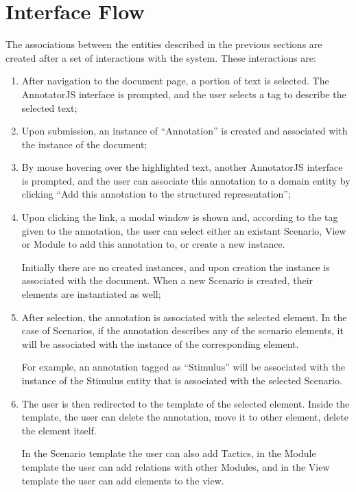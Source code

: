 \section{Interface Flow}
\label{section:interfaceFlow}

The associations between the entities described in the previous sections are created after a set of interactions with the system. These interactions are:

\begin{enumerate}
\item After navigation to the document page, a portion of text is selected. The AnnotatorJS interface is prompted, and the user selects a tag to describe the selected text;

\item Upon submission, an instance of ``Annotation'' is created and associated with the instance of the document;

\item By mouse hovering over the highlighted text, another AnnotatorJS interface is prompted, and the user can associate this annotation to a domain entity by clicking ``Add this annotation to the structured representation'';

\item Upon clicking the link, a modal window is shown and, according to the tag given to the annotation, the user can select either an existant Scenario, View or Module to add this annotation to, or create a new instance. 

Initially there are no created instances, and upon creation the instance is associated with the document. When a new Scenario is created, their elements are instantiated as well;

\item After selection, the annotation is associated with the selected element. In the case of Scenarios, if the annotation describes any of the scenario elements, it will be associated with the instance of the corresponding element. 

For example, an annotation tagged as ``Stimulus'' will be associated with the instance of the Stimulus entity that is associated with the selected Scenario.

\item The user is then redirected to the template of the selected element. Inside the template, the user can delete the annotation, move it to other element, delete the element itself. 

In the Scenario template the user can also add Tactics, in the Module template the user can add relations with other Modules, and in the View template the user can add elements to the view.
\end{enumerate}








